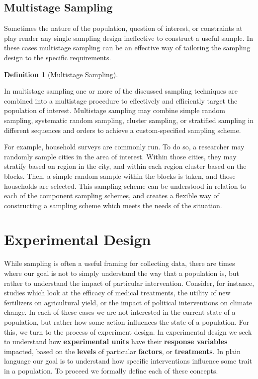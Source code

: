 \documentclass[
  letterpaper,
  DIV=11,
  numbers=noendperiod]{scrreprt}
\theoremstyle{definition}
\theoremstyle{definition}
\theoremstyle{definition}
\newtheorem{definition}{Definition}[chapter]
\theoremstyle{remark}
\begin{document}
\subsection{Multistage Sampling}\label{multistage-sampling}

Sometimes the nature of the population, question of interest, or
constraints at play render any single sampling design ineffective to
construct a useful sample. In these cases multistage sampling can be an
effective way of tailoring the sampling design to the specific
requirements.

\begin{definition}[Multistage
Sampling]\protect\hypertarget{def-multistage-sample}{}\label{def-multistage-sample}

In multistage sampling one or more of the discussed sampling techniques
are combined into a multistage procedure to effectively and efficiently
target the population of interest. Multistage sampling may combine
simple random sampling, systematic random sampling, cluster sampling, or
stratified sampling in different sequences and orders to achieve a
custom-specified sampling scheme.

\end{definition}

For example, household surveys are commonly run. To do so, a researcher
may randomly sample cities in the area of interest. Within those cities,
they may stratify based on region in the city, and within each region
cluster based on the blocks. Then, a simple random sample within the
blocks is taken, and those households are selected. This sampling scheme
can be understood in relation to each of the component sampling schemes,
and creates a flexible way of constructing a sampling scheme which meets
the needs of the situation.

\section{Experimental Design}\label{experimental-design}

While sampling is often a useful framing for collecting data, there are
times where our goal is not to simply understand the way that a
population is, but rather to understand the impact of particular
intervention. Consider, for instance, studies which look at the efficacy
of medical treatments, the utility of new fertilizers on agricultural
yield, or the impact of political interventions on climate change. In
each of these cases we are not interested in the current state of a
population, but rather how some action influences the state of a
population. For this, we turn to the process of experiment design. In
experimental design we seek to understand how \textbf{experimental
units} have their \textbf{response variables} impacted, based on the
\textbf{levels} of particular \textbf{factors}, or \textbf{treatments}.
In plain language our goal is to understand how specific interventions
influence some trait in a population. To proceed we formally define each
of these concepts.
\end{document}
